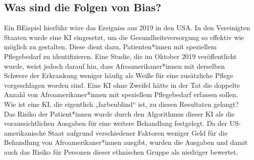 \subsection{Was sind die Folgen von Bias?}
Ein BEispiel hierführ wäre das Ereigniss aus 2019 in den USA.
In den Vereinigten Staaten wurde eine KI eingesetzt, um die 
Gesundheitsversorgung so effektiv wie möglich zu gestalten. 
Diese dient dazu, Patienten*innen mit speziellem Pflegebedarf zu 
identifizieren. 
Eine Studie, die im Oktober 2019 veröffentlicht wurde, weist jedoch darauf hin, 
dass Afroamerikaner*innen mit derselben Schwere der Erkrankung weniger 
häufig als Weiße für eine zusätzliche Pflege vorgeschlagen worden sind. 
Eine KI ohne Zweifel hätte in der Tat die doppelte Anzahl von Afroamerikaner*innen mit 
speziellem Pflegebedarf erfassen sollen. Wie ist eine KI, die eigentlich 
„farbenblind“ ist, zu diesen Resultaten gelangt?
Das Risiko der Patient*innen wurde durch den Algorithmus 
dieser KI als die voraussichtlichen Ausgaben für eine weitere Behandlung
festgelegt. Da der US-amerikanische Staat aufgrund verschiedener Faktoren weniger Geld für die 
Behandlung von Afroamerikaner*innen ausgibt, wurden die Ausgaben und damit auch das 
Risiko für Personen dieser ethnischen Gruppe als niedriger bewertet.